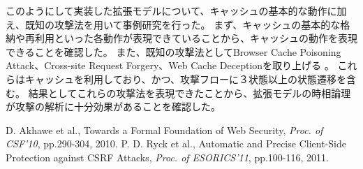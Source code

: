 \documentclass[a4paper]{jarticle}
\begin{document}
このようにして実装した拡張モデルについて、キャッシュの基本的な動作に加え、既知の攻撃法を用いて事例研究を行った。
まず、キャッシュの基本的な格納や再利用といった各動作が表現できていることから、キャッシュの動作を表現できることを確認した。
また、既知の攻撃法としてBrowser Cache Poisoning Attack、Cross-site Request Forgery、Web Cache Deceptionを取り上げる
。
これらはキャッシュを利用しており、かつ、攻撃フローに３状態以上の状態遷移を含む。
結果としてこれらの攻撃法を表現できたことから、拡張モデルの時相論理が攻撃の解析に十分効果があることを確認した。

\begin{thebibliography}{9}
 D. Akhawe et al., Towards a Formal Foundation of Web Security, \textit{Proc. of CSF'10}, pp.290-304, 2010.
 P. D. Ryck et al., Automatic and Precise Client-Side Protection against CSRF Attacks, \textit{Proc. of ESORICS'11}, pp.100-116, 2011.
\end{thebibliography}
\end{document}
